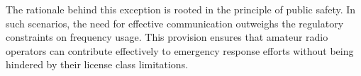 The rationale behind this exception is rooted in the principle of public safety. In such scenarios, the need for effective communication outweighs the regulatory constraints on frequency usage. This provision ensures that amateur radio operators can contribute effectively to emergency response efforts without being hindered by their license class limitations.

